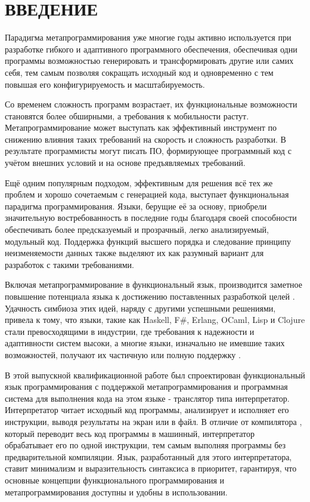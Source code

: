 \section*{ВВЕДЕНИЕ}

Парадигма метапрограммирования уже многие годы активно используется при разработке гибкого и адаптивного программного обеспечения, обеспечивая одни программы возможностью генерировать и трансформировать другие или самих себя, тем самым позволяя сокращать исходный код и одновременно с тем повышая его конфигурируемость и масштабируемость.

Со временем сложность программ возрастает, их функциональные возможности становятся более обширными, а требования к мобильности растут. Метапрограммирование может выступать как эффективный инструмент по снижению влияния таких требований на скорость и сложность разработки. В результате программисты могут писать ПО, формирующее программный код с учётом внешних условий и на основе предъявляемых требований.

Ещё одним популярным подходом, эффективным для решения всё тех же проблем и хорошо сочетаемым с генерацией кода, выступает функциональная парадигма программирования. Языки, берущие её за основу, приобрели значительную востребованность в последние годы благодаря своей способности обеспечивать более предсказуемый и прозрачный, легко анализируемый, модульный код. Поддержка функций высшего порядка и следование принципу неизменяемости данных также выделяют их как разумный вариант для разработок с такими требованиями.

Включая метапрограммирование в функциональный язык, производится заметное повышение потенциала языка к достижению поставленных разработкой целей \cite{e31}. Удачность симбиоза этих идей, наряду с другими успешными решениями, привела к тому, что языки, такие как Haskell, F\#, Erlang, OCaml, Lisp и Clojure стали превосходящими в индустрии, где требования к надежности и адаптивности систем высоки, а многие языки, изначально не имевшие таких возможностей, получают их частичную или полную поддержку \cite{e30}.

В этой выпускной квалификационной работе был спроектирован функциональный язык программирования с поддержкой метапрограммирования и программная система для выполнения кода на этом языке - транслятор типа интерпретатор. Интерпретатор читает исходный код программы, анализирует и исполняет его инструкции, выводя результаты на экран или в файл. В отличие от компилятора \cite{e3}, который переводит весь код программы в машинный, интерпретатор обрабатывает его по одной инструкции, тем самым выполняя программы без предварительной компиляции. Язык, разработанный для этого интерпретатора, ставит минимализм и выразительность синтаксиса в приоритет, гарантируя, что основные концепции функционального программирования и метапрограммирования доступны и удобны в использовании.

